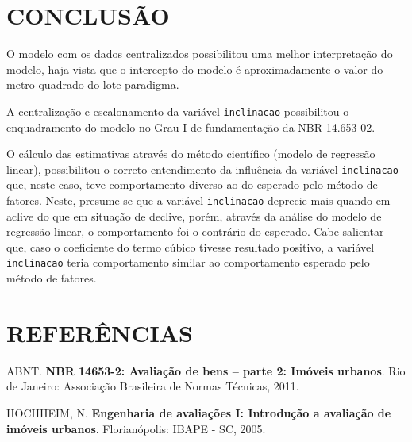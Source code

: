 \documentclass[a4paper, 12pt]{article}
\begin{document}
\hypertarget{conclusao}{%
\section{CONCLUSÃO}\label{conclusao}}

O modelo com os dados centralizados possibilitou uma melhor
interpretação do modelo, haja vista que o intercepto do modelo é
aproximadamente o valor do metro quadrado do lote paradigma.

A centralização e escalonamento da variável \texttt{inclinacao}
possibilitou o enquadramento do modelo no Grau I de fundamentação da NBR
14.653-02.

O cálculo das estimativas através do método científico (modelo de
regressão linear), possibilitou o correto entendimento da influência da
variável \texttt{inclinacao} que, neste caso, teve comportamento diverso
ao do esperado pelo método de fatores. Neste, presume-se que a variável
\texttt{inclinacao} deprecie mais quando em aclive do que em situação de
declive, porém, através da análise do modelo de regressão linear, o
comportamento foi o contrário do esperado. Cabe salientar que, caso o
coeficiente do termo cúbico tivesse resultado positivo, a variável
\texttt{inclinacao} teria comportamento similar ao comportamento
esperado pelo método de fatores.

\hypertarget{referencias}{%
\section*{REFERÊNCIAS}\label{referencias}}

\hypertarget{refs}{}
\leavevmode\hypertarget{ref-NBR1465302}{}%
ABNT. \textbf{NBR 14653-2: Avaliação de bens -- parte 2: Imóveis
urbanos}. Rio de Janeiro: Associação Brasileira de Normas Técnicas,
2011.

\leavevmode\hypertarget{ref-hochheim2005}{}%
HOCHHEIM, N. \textbf{Engenharia de avaliações I: Introdução a avaliação
de imóveis urbanos}. Florianópolis: IBAPE - SC, 2005.
\end{document}
